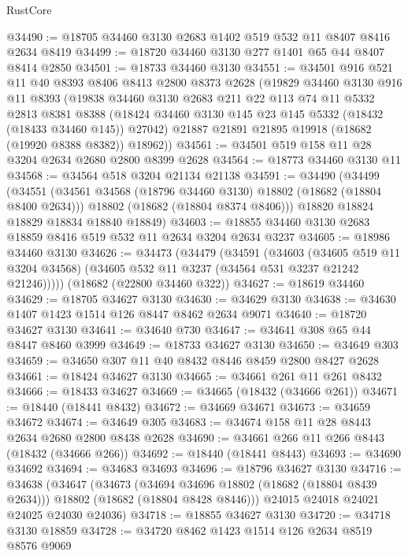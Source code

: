 \begin{lexlean}{RustCore}
\begin{coremodule}
@34490 := @18705 @34460 @3130 @2683 @1402 @519 @532 @11 @8407 @8416 @2634 @8419
@34499 := @18720 @34460 @3130 @277 @1401 @65 @44 @8407 @8414 @2850
@34501 := @18733 @34460 @3130
@34551 := @34501
    @916
    @521
    @11
    @40
    @8393
    @8406
    @8413
    @2800
    @8373
    @2628
    (@19829
      @34460
      @3130
      @916
      @11
      @8393
      (@19838
        @34460
        @3130
        @2683
        @211
        @22
        @113
        @74
        @11
        @5332
        @2813
        @8381
        @8388
        (@18424 @34460 @3130 @145 @23 @145 @5332 (@18432 (@18433 @34460 @145)) @27042)
        @21887
        @21891
        @21895
        @19918
        (@18682 (@19920 @8388 @8382))
        @18962))
@34561 := @34501 @519 @158 @11 @28 @3204 @2634 @2680 @2800 @8399 @2628
@34564 := @18773 @34460 @3130 @11
@34568 := @34564 @518 @3204 @21134 @21138
@34591 := @34490
    (@34499
      (@34551
        (@34561 @34568 (@18796 @34460 @3130) @18802 (@18682 (@18804 @8400 @2634)))
        @18802
        (@18682 (@18804 @8374 @8406)))
      @18820
      @18824
      @18829
      @18834
      @18840
      @18849)
@34603 := @18855 @34460 @3130 @2683 @18859 @8416 @519 @532 @11 @2634 @3204 @2634 @3237
@34605 := @18986 @34460 @3130
@34626 := @34473
    (@34479
      (@34591
        (@34603
          (@34605 @519 @11 @3204 @34568)
          (@34605 @532 @11 @3237 (@34564 @531 @3237 @21242 @21246)))))
    (@18682 (@22800 @34460 @322))
@34627 := @18619 @34460
@34629 := @18705 @34627 @3130
@34630 := @34629 @3130
@34638 := @34630 @1407 @1423 @1514 @126 @8447 @8462 @2634 @9071
@34640 := @18720 @34627 @3130
@34641 := @34640 @730
@34647 := @34641 @308 @65 @44 @8447 @8460 @3999
@34649 := @18733 @34627 @3130
@34650 := @34649 @303
@34659 := @34650 @307 @11 @40 @8432 @8446 @8459 @2800 @8427 @2628
@34661 := @18424 @34627 @3130
@34665 := @34661 @261 @11 @261 @8432
@34666 := @18433 @34627
@34669 := @34665 (@18432 (@34666 @261))
@34671 := @18440 (@18441 @8432)
@34672 := @34669 @34671
@34673 := @34659 @34672
@34674 := @34649 @305
@34683 := @34674 @158 @11 @28 @8443 @2634 @2680 @2800 @8438 @2628
@34690 := @34661 @266 @11 @266 @8443 (@18432 (@34666 @266))
@34692 := @18440 (@18441 @8443)
@34693 := @34690 @34692
@34694 := @34683 @34693
@34696 := @18796 @34627 @3130
@34716 := @34638
    (@34647
      (@34673
        (@34694 @34696 @18802 (@18682 (@18804 @8439 @2634)))
        @18802
        (@18682 (@18804 @8428 @8446)))
      @24015
      @24018
      @24021
      @24025
      @24030
      @24036)
@34718 := @18855 @34627 @3130
@34720 := @34718 @3130 @18859
@34728 := @34720 @8462 @1423 @1514 @126 @2634 @8519 @8576 @9069

\end{coremodule}
\end{lexlean}
